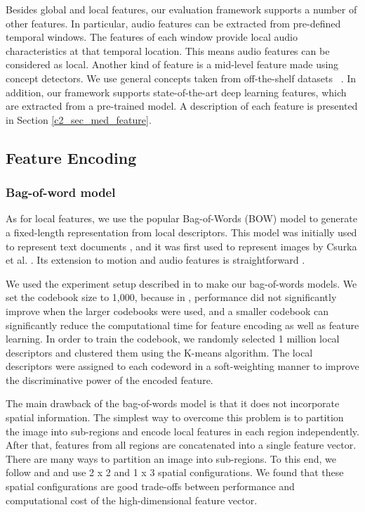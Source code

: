 Besides global and local features, our evaluation framework supports a number of other features. In particular, audio features can be extracted from pre-defined temporal windows. The features of each window provide local audio characteristics at that temporal location. This means audio features can be considered as local. Another kind of feature is a mid-level feature made using concept detectors. We use general concepts taken from off-the-shelf datasets ~\cite{deng2009imagenet}. In addition, our framework supports state-of-the-art deep learning features, which are extracted from a pre-trained model. A description of each feature is presented in Section \ref{c2_sec_med_feature}.

\subsection{Feature Encoding}
\label{c2_sec_feature_encoding}

\subsubsection{Bag-of-word model}
As for local features, we use the popular Bag-of-Words (BOW) model to generate a fixed-length representation from local descriptors. This model was initially used to represent text documents \cite{harris1954distributional}, and it was first used to represent images by Csurka et al. \cite{Csurka04visualcategorization}. Its extension to motion and audio features is straightforward \cite{sivic2009efficient,jiang2010columbia}.

We used the experiment setup described in \cite{jiang2010representations} to make our bag-of-words models. We set the codebook size to 1,000, because in \cite{jiang2010representations}, performance did not significantly improve when the larger codebooks were used, and a smaller codebook can significantly reduce the computational time for feature encoding as well as feature learning. In order to train the codebook, we randomly selected 1 million local descriptors and clustered them using the K-means algorithm. The local descriptors were assigned to each codeword in a soft-weighting manner \cite{Jiang:2007:TOB} to improve the discriminative power of the encoded feature.

The main drawback of the bag-of-words model is that it does not incorporate spatial information. The simplest way to overcome this problem is to partition the image into sub-regions and encode local features in each region independently. After that, features from all regions are concatenated into a single feature vector. There are many ways to partition an image into sub-regions. To this end, we follow \cite{jiang2010representations} and \cite{lazebnik2006beyond} and use 2 x 2 and 1 x 3 spatial configurations. We found that these spatial configurations are good trade-offs between performance and computational cost of the high-dimensional feature vector.

